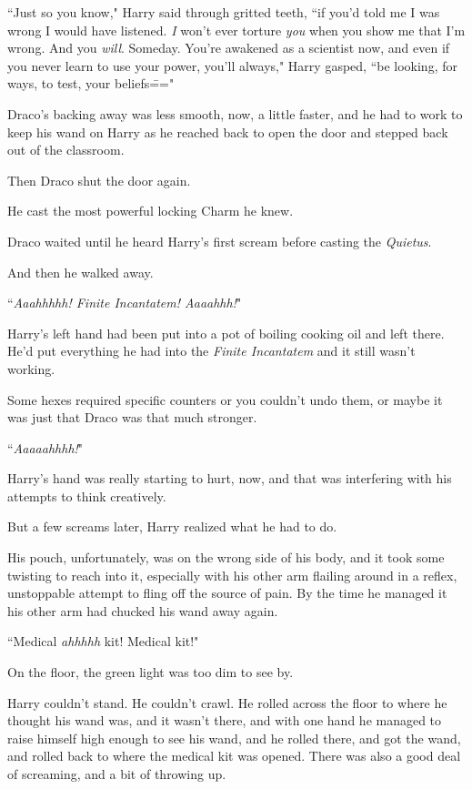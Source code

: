 ``Just so you know," Harry said through gritted teeth, ``if you'd told me I was wrong I would have listened. \emph{I} won't ever torture \emph{you} when you show me that I'm wrong. And you \emph{will}. Someday. You're awakened as a scientist now, and even if you never learn to use your power, you'll always," Harry gasped, ``be looking, for ways, to test, your beliefs\==="

Draco's backing away was less smooth, now, a little faster, and he had to work to keep his wand on Harry as he reached back to open the door and stepped back out of the classroom.

Then Draco shut the door again.

He cast the most powerful locking Charm he knew.

Draco waited until he heard Harry's first scream before casting the \emph{Quietus}.

And then he walked away.

\later

``\emph{Aaahhhhh! Finite Incantatem! Aaaahhh!}"

Harry's left hand had been put into a pot of boiling cooking oil and left there. He'd put everything he had into the \emph{Finite Incantatem} and it still wasn't working.

Some hexes required specific counters or you couldn't undo them, or maybe it was just that Draco was that much stronger.

``\emph{Aaaaahhhh!}"

Harry's hand was really starting to hurt, now, and that was interfering with his attempts to think creatively.

But a few screams later, Harry realized what he had to do.

His pouch, unfortunately, was on the wrong side of his body, and it took some twisting to reach into it, especially with his other arm flailing around in a reflex, unstoppable attempt to fling off the source of pain. By the time he managed it his other arm had chucked his wand away again.

``Medical \emph{ahhhhh} kit! Medical kit!"

On the floor, the green light was too dim to see by.

Harry couldn't stand. He couldn't crawl. He rolled across the floor to where he thought his wand was, and it wasn't there, and with one hand he managed to raise himself high enough to see his wand, and he rolled there, and got the wand, and rolled back to where the medical kit was opened. There was also a good deal of screaming, and a bit of throwing up.

